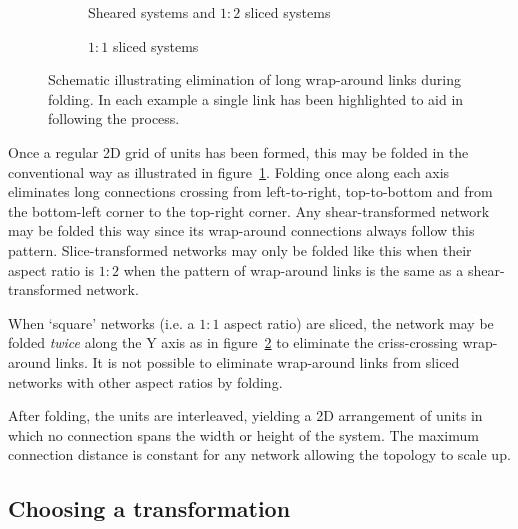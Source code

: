 			\begin{figure}
				\begin{subfigure}{\linewidth}
					\center
					\caption{Sheared systems and $1:2$ sliced systems}
					\label{fig:folding-sheared}
				\end{subfigure}
				
				\vspace{1em}
				
				\begin{subfigure}{\linewidth}
					\center
					\caption{$1:1$ sliced systems}
					\label{fig:folding-sliced}
				\end{subfigure}
				
				\caption[Elimination of long wrap-around links by folding.]%
				{Schematic illustrating elimination of long wrap-around links
				during folding. In each example a single link has been highlighted to
				aid in following the process.}
				\label{fig:folding}
			\end{figure}
			
			Once a regular 2D grid of units has been formed, this may be folded in
			the conventional way as illustrated in figure~\ref{fig:folding-sheared}.
			Folding once along each axis eliminates long connections crossing from
			left-to-right, top-to-bottom and from the bottom-left corner to the
			top-right corner. Any shear-transformed network may be folded this way
			since its wrap-around connections always follow this pattern.
			Slice-transformed networks may only be folded like this when their aspect
			ratio is $1:2$ when the pattern of wrap-around links is the same as a
			shear-transformed network.
			
			When `square' networks (i.e. a $1:1$ aspect ratio) are sliced, the
			network may be folded \emph{twice} along the Y axis as in
			figure~\ref{fig:folding-sliced} to eliminate the criss-crossing
			wrap-around links. It is not possible to eliminate wrap-around links from
			sliced networks with other aspect ratios by folding.
			
			After folding, the units are interleaved, yielding a 2D arrangement of
			units in which no connection spans the width or height of the system. The
			maximum connection distance is constant for any network allowing the
			topology to scale up.
		
		\subsection{Choosing a transformation}
			
